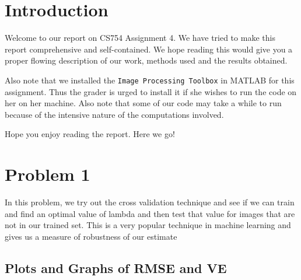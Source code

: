 \documentclass[a4paper,14pt]{article}
\numberwithin{definition}{section}
\numberwithin{mytheorem}{subsection}
\begin{document}

\date{Spring 2022}
\maketitle

\justifying
\tableofcontents

\newpage
\justifying
\section*{Introduction}

Welcome  to our report on CS754 Assignment 4. We have tried to make this report comprehensive and self-contained. We hope reading this would give you a proper flowing description of our work, methods used and the results obtained.

Also note that we installed the \texttt{Image Processing Toolbox} in MATLAB for this assignment. Thus the grader is urged to install it if she wishes to run the code on her on her machine. Also note that some of our code may take a while to run because of the intensive nature of the computations involved.

Hope you enjoy reading the report. Here we go!
\section{Problem 1}


In this problem, we try out the cross validation technique and see if we can train and find an optimal value of lambda and then test that value for images that are not in our trained set. This is a very popular technique in machine learning and gives us a measure of robustness of our estimate


\subsection{Plots and Graphs of RMSE and VE}
\end{document}
